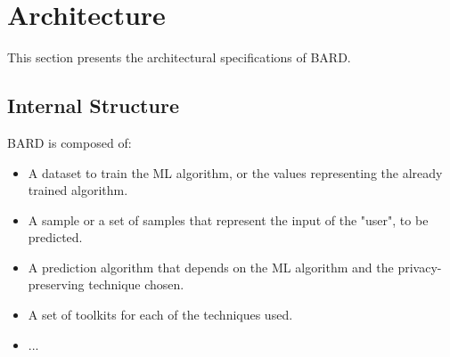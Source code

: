 
\section{Architecture}
\label{sec:Arquitecture}



This section presents the architectural specifications of \ac{BARD}.


\subsection{Internal Structure}
\label{subsec:CryptoDomainImplementation}


\ac{BARD} is composed of:

\begin{itemize}
	\setlength\itemsep{1em}
	\item A dataset to train the \ac{ML} algorithm, or the values representing the already trained algorithm.
	\item A sample or a set of samples that represent the input of the "user", to be predicted.
	\item A prediction algorithm that depends on the \ac{ML} algorithm and the privacy-preserving technique chosen.
	\item A set of toolkits for each of the techniques used.
	\item ...
\end{itemize}




